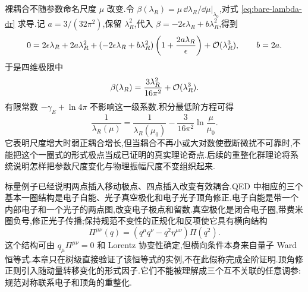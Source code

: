 裸耦合不随参数命名尺度 $\mu$ 改变.令
$\beta(\lambda_R)=\mu\,\dd\lambda_R/\dd\mu\vert_{\lambda_0}$,对式 \eqref{eq:bare-lambda-dr} 求导.记 $a=3/(32\pi^2)$,保留 $\lambda_R^2$,代入 $\beta=-2\epsilon\lambda_R+b\lambda_R^2$,得到
\begin{equation}
 0=2\epsilon\lambda_R+2a\lambda_R^2
 +(-2\epsilon\lambda_R+b\lambda_R^2)
 \left(1+\frac{2a\lambda_R}{\epsilon}\right)+\mathcal O(\lambda_R^3),
 \qquad b=2a.
\end{equation}
于是四维极限中
\begin{equation}
 \beta(\lambda_R)=\frac{3\lambda_R^2}{16\pi^2}+\mathcal O(\lambda_R^3).
 \label{eq:phi4-beta-first}
\end{equation}
有限常数 $-\gamma_E+\ln4\pi$ 不影响这一级系数.积分最低阶方程可得
\begin{equation}
 \frac1{\lambda_R(\mu)}=\frac1{\lambda_R(\mu_0)}
 -\frac3{16\pi^2}\ln\frac\mu{\mu_0}.
\end{equation}
它表明尺度增大时弱正耦合增长,但当耦合不再小或大对数使截断微扰不可靠时,不能把这个一圈式的形式极点当成已证明的真实理论奇点.后续的重整化群理论将系统说明怎样把参数尺度变化与物理振幅尺度不变组织起来.


标量例子已经说明两点插入移动极点、四点插入改变有效耦合.QED 中相应的三个基本一圈结构是电子自能、光子真空极化和电子光子顶角修正.电子自能是带一个内部电子和一个光子的两点图,改变电子极点和留数.真空极化是闭合电子圈,带费米圈负号,修正光子传播;保持规范不变性的正规化和反项使它具有横向结构
\begin{equation}
 \Pi^{\mu\nu}(q)=(q^\mu q^\nu-q^2\eta^{\mu\nu})\Pi(q^2).
\end{equation}
这个结构可由 $q_\mu\Pi^{\mu\nu}=0$ 和 Lorentz 协变性确定,但横向条件本身来自量子 Ward 恒等式.本章只在树级直接验证了该恒等式的实例,不在此假称完成全阶证明.顶角修正则引入随动量转移变化的形式因子.它们不能被理解成三个互不关联的任意调参:规范对称联系电子和顶角的重整化.

